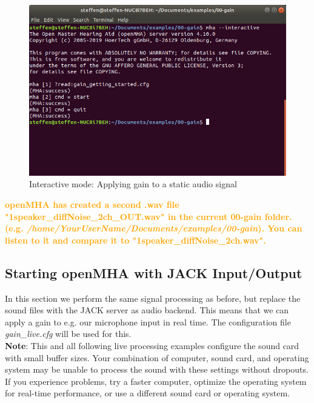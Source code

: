 \documentclass[11pt,a4paper,twoside]{article}
\newcommand{\+}{\discretionary{\mbox{\scriptsize$\hookleftarrow$}}{}{}}
\begin{document}
{{\begin{figure}[H]
\centering
\includegraphics[scale=0.4]{static_gain.png}
\caption{Interactive mode: Applying gain to a static audio signal}
\end{figure}

\textcolor{orange}{\textbf{openMHA has created a second .wav file "1speaker\_diffNoise\_2ch\_OUT.wav" in the current 00-gain folder. (e.g. \textit{/home/YourUserName/Documents/examples/00-gain}). You can listen to it and compare it to "1speaker\_diffNoise\_2ch.wav".}}

\newpage

\subsection{Starting openMHA with JACK Input/Output}

In this section we perform the same signal processing as before, but replace the sound files with the JACK server as audio backend. This means that we can apply a gain to e.g. our microphone input in real time. The configuration file {{\ttfamily \textit{gain\_live.cfg}}} will be used for this. \\

\large{\textbf{Note}}:
This and all following live processing examples configure
the sound card with small buffer sizes. Your combination of
computer, sound card, and operating system may be unable
to process the sound with these settings without dropouts.
If you experience problems, try a faster computer, optimize
the operating system for real-time performance, or use a
different sound card or operating system.
\\

}}
\end{document}
